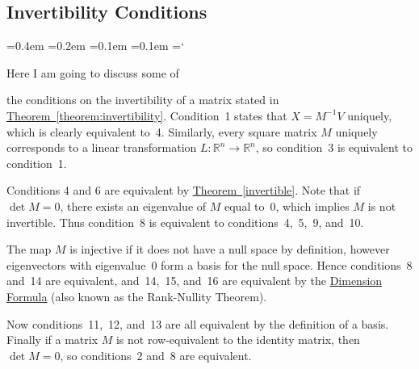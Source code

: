 
\subsection*{Invertibility Conditions}

{\ttfamily
{}\font=0.4em
\font=0.2em
\font=0.1em
\font=0.1em
\hyphenchar\font=`\-


\hypertarget{scripts_kernel_range_nullity_rank_inv_cond}{Here I am going to discuss some of} the conditions on the invertibility of a matrix stated in \hyperref[theorem:invertibility]{Theorem~\ref*{theorem:invertibility}}. Condition~1 states that $X = M^{-1}V$ uniquely, which is clearly equivalent to~4. Similarly, every square matrix $M$ uniquely corresponds to a linear transformation $L \colon \mathbb{R}^n \rightarrow \mathbb{R}^n$, so condition~3 is equivalent to condition~1.

Conditions 4 and 6 are equivalent by \hyperref[detinvertible]{Theorem~\ref*{invertible}}.
Note that if $\det M = 0$, there exists an eigenvalue of $M$ equal to~$0$, which implies $M$ is not invertible. Thus condition~8 is equivalent to conditions~4,~5,~9, and~10.

The map $M$ is injective if it does not have a null space by definition, however eigenvectors with eigenvalue~$0$ form a basis for the null space. Hence conditions~8 and~14 are equivalent, and~14,~15, and~16 are equivalent by the \hyperref[dimension_formula]{Dimension Formula} (also known as the Rank-Nullity Theorem).

Now conditions~11,~12, and~13 are all equivalent by the definition of a basis. Finally if a matrix $M$ is not row-equivalent to the identity matrix, then $\det M = 0$, so conditions~2 and~8 are equivalent.

} %

